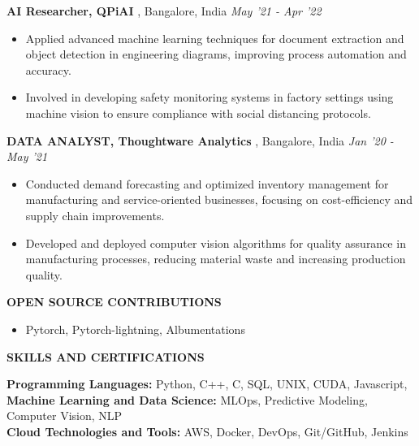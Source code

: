\documentclass[10pt,a4]{article}
\begin{document}
{\begin{flushleft}
        \textbf{\large AI Researcher, QPiAI }, \large Bangalore, India \hfill \textit{\large May '21 - Apr '22}	\\
        \begin{itemize}
            \item Applied advanced machine learning techniques for document extraction and object detection in engineering diagrams, improving process automation and accuracy.
            \item Involved in developing safety monitoring systems in factory settings using machine vision to ensure compliance with social distancing protocols.
        \end{itemize}		

        \textbf{\large DATA ANALYST, Thoughtware Analytics }, \large Bangalore, India \hfill \textit{\large Jan '20 - May '21}	\\		
        \begin{itemize}
            \item Conducted demand forecasting and optimized inventory management for manufacturing and service-oriented businesses, focusing on cost-efficiency and supply chain improvements.
            \item Developed and deployed computer vision algorithms for quality assurance in manufacturing processes, reducing material waste and increasing production quality.   
        \end{itemize}	

        \textbf{\large OPEN SOURCE CONTRIBUTIONS}
        \begin{itemize}
            \item Pytorch, Pytorch-lightning, Albumentations
        \end{itemize}
\end{flushleft}



\begin{flushleft}
    {\Large \textbf {SKILLS AND CERTIFICATIONS}}

    \vspace{1mm}
    \begin{itemize}
        \hspace{0.25cm} \large \textbf{Programming Languages:} Python, C++, C, SQL, UNIX, CUDA, Javascript,  \\
        \hspace{0.25cm} \large \textbf{Machine Learning and Data Science:} MLOps, Predictive Modeling, Computer Vision, NLP   \\
        \hspace{0.25cm} \large \textbf{Cloud Technologies and Tools:} AWS, Docker, DevOps, Git/GitHub, Jenkins  \\
    

\end{itemize}
\end{flushleft}}
\end{document}
